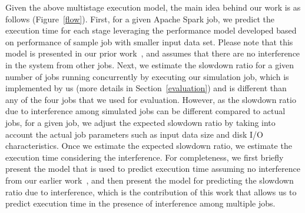 \noindent
Given the above multistage execution model, the main idea behind our work is as follows (Figure~\ref{flow}). First, for a given Apache Spark job, we predict the execution time for each stage leveraging the performance model developed based on performance of sample job with smaller input data set. Please note that this model is presented in our prior work~\cite{wangperformance}, and assumes that there are no interference in the system from other jobs. Next, we estimate the slowdown ratio for a given number of jobs running concurrently by executing our simulation job, which is implemented by us (more details in Section~\ref{evaluation}) and is different than any of the four jobs that we used for evaluation. However, as the slowdown ratio due to interference among simulated jobs can be different compared to actual jobs, for a given job, we adjust the expected slowdown ratio by taking into account the actual job parameters such as input data size and disk I/O characteristics. Once we estimate the expected slowdown ratio, we estimate the execution time considering the interference. For completeness, we first briefly present the model that is used to predict execution time assuming no interference from our earlier work~\cite{wangperformance}, and then present the model for predicting the slowdown ratio due to interference, which is the contribution of this work that allows us to predict execution time in the presence of interference among multiple jobs. 


